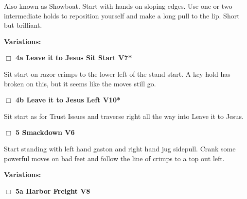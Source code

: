 \begin{multicols}{2}
\begin{adjustwidth}{1.3em}{}
Also known as Showboat. Start with hands on sloping edges. Use one or two intermediate holds to reposition yourself and make a long pull to the lip. Short but brilliant.
\end{adjustwidth}


\begin{adjustwidth}{0.5cm}{}				
\needspace{4em}
\textbf{Variations:} \newline

\needspace{2em}
\label{vr:Leave it to Jesus Sit Start}
\colorbox{Goldenrod!20}{
\parbox{0.95\linewidth}{
\hspace{-1ex}\textbf{$\Box$
4a Leave it to Jesus Sit Start V7*  
}}}
\begin{adjustwidth}{1.3em}{}			

Sit start on razor crimps to the lower left of the stand start. A key hold has broken on this, but it seems like the moves still go.
\end{adjustwidth}




\needspace{2em}
\label{vr:Leave it to Jesus Left}
\colorbox{red!20}{
\parbox{0.95\linewidth}{
\hspace{-1ex}\textbf{$\Box$
4b Leave it to Jesus Left V10*  
}}}
\begin{adjustwidth}{1.3em}{}			

Sit start as for Trust Issues and traverse right all the way into Leave it to Jesus.
\end{adjustwidth}



\end{adjustwidth}


\needspace{2em}
\label{rt:Smackdown}
\colorbox{RoyalBlue!20}{
\parbox{0.95\linewidth}{
\hspace{-1ex}\textbf{$\Box$
5 Smackdown V6  
}}}
\begin{adjustwidth}{1.3em}{}			

Start standing with left hand gaston and right hand jug sidepull. Crank some powerful moves on bad feet and follow the line of crimps to a top out left.
\end{adjustwidth}


\begin{adjustwidth}{0.5cm}{}				
\needspace{4em}
\textbf{Variations:} \newline

\needspace{2em}
\label{vr:Harbor Freight}
\colorbox{Goldenrod!20}{
\parbox{0.95\linewidth}{
\hspace{-1ex}\textbf{$\Box$
5a Harbor Freight V8  
}}}
\begin{adjustwidth}{1.3em}{}			


\end{adjustwidth}
\end{adjustwidth}
\end{multicols}

